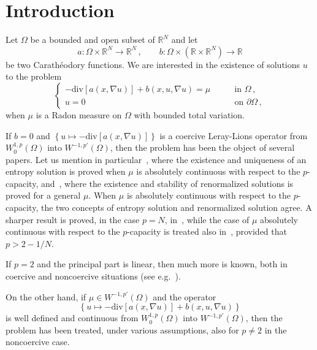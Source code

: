 \documentclass[twoside,reqno]{amsart}
\numberwithin{equation}{section}
\theoremstyle{definition}
\newcommand{\R}{\mathbb{R}}
\begin{document}
\section{Introduction}
%
Let $\Omega$ be a bounded and open subset of $\R^N$ and let 
\[
a:\Omega\times\R^N\rightarrow\R^N\,,\qquad
b:\Omega\times(\R\times\R^N)\rightarrow\R
\]
be two Carath\'eodory functions.
We are interested in the existence of solutions $u$ to the problem
\begin{equation}
\label{eq:main}
\begin{cases}
- \mathrm{div}[a(x,\nabla u)] + b(x,u,\nabla u)=\mu 
&\qquad\text{in $\Omega$}\,,\\
u=0
&\qquad\text{on $\partial\Omega$}\,,
\end{cases}
\end{equation}
when $\mu$ is a Radon measure on $\Omega$ with bounded total
variation.
\par
If $b=0$ and 
$\left\{u\mapsto - \mathrm{div}[a(x,\nabla u)]\right\}$
is a coercive Leray-Lions operator from $W^{1,p}_0(\Omega)$ into
$W^{-1,p'}(\Omega)$, then the problem has 
been the object of several papers.
Let us mention in 
particular~\cite{boccardo_gallouet_orsina1996}, where the existence
and uniqueness of an entropy solution is proved when $\mu$ is
absolutely continuous with respect to the $p$-capacity, 
and~\cite{dalmaso_murat_orsina_prignet1999}, where the existence 
and stability of renormalized solutions is proved for a
general $\mu$.
When $\mu$ is absolutely continuous with respect to the 
$p$-capacity, the two concepts of entropy solution and
renormalized solution agree.
A sharper result is proved, in the case $p=N$, 
in~\cite{greco_iwaniec_sbordone1997},
while the case of $\mu$ absolutely continuous with respect to 
the $p$-capacity is treated also
in~\cite{kilpelainen_xu1996}, provided that $p>2-1/N$.
\par
If $p=2$ and the principal part is linear, then much more is known,
both in coercive and noncoercive situations (see
e.g.~\cite{amann_quittner1998, brezis_marcus_ponce2007,
degiovanni_scaglia2011, ferrero_saccon2006, ferrero_saccon2007,
ferrero_saccon2010, marcus_veron2014, orsina1993, veron2004}).
\par
On the other hand, if $\mu\in W^{-1,p'}(\Omega)$ and the operator
\[
\left\{u\mapsto - \mathrm{div}[a(x,\nabla u)]
+ b(x,u,\nabla u)\right\}
\] 
is well defined and continuous from $W^{1,p}_0(\Omega)$ into
$W^{-1,p'}(\Omega)$, then the problem has been treated, under 
various assumptions, also for $p\neq 2$ in the noncoercive case.
\end{document}
